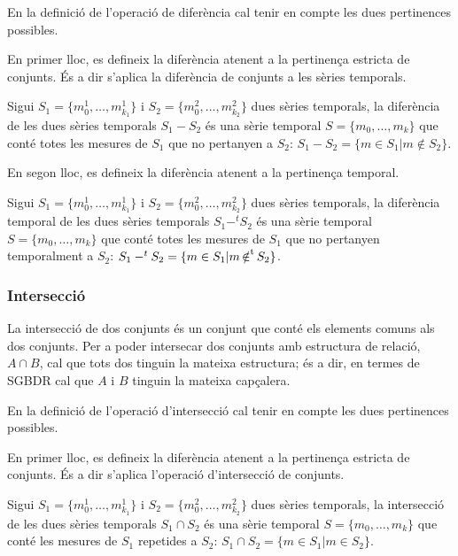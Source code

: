 En la definició de l'operació de diferència cal tenir en compte les
dues pertinences possibles.

En primer lloc, es defineix la diferència atenent a la pertinença
estricta de conjunts. És a dir s'aplica la diferència de
conjunts a les sèries temporals.
\begin{definition}[diferència]
  Sigui $S_1=\{m_0^1, \dotsc, m_{k_1}^1\}$ i $S_2=\{m_0^2, \dotsc,
  m_{k_2}^2\}$ dues sèries temporals, la diferència de les dues
  sèries temporals $S_1 - S_2$ és una sèrie temporal $S=\{m_0,
  \dotsc, m_k\}$ que conté totes les mesures de $S_1$ que no pertanyen a
  $S_2$: $S_1 - S_2 = \{ m \in S_1 | m \notin S_2  \}$.
\end{definition}

En segon lloc, es defineix la diferència atenent a la pertinença
temporal.
\begin{definition}
  Sigui $S_1=\{m_0^1, \dotsc, m_{k_1}^1\}$ i $S_2=\{m_0^2, \dotsc,
  m_{k_2}^2\}$ dues sèries temporals, la diferència temporal de les
  dues sèries temporals $S_1 -^t S_2$ és una sèrie temporal
  $S=\{m_0, \dotsc, m_k\}$ que conté totes les mesures de $S_1$ que no
  pertanyen temporalment a $S_2$: $S_1 -^t S_2 = \{ m \in S_1 | m
  \operatorname*{\notin^t} S_2 \}$.
\end{definition}




\subsubsection{Intersecció}

La intersecció de dos conjunts és un conjunt que conté els elements
comuns als dos conjunts.  Per a poder intersecar dos conjunts amb estructura
de relació, $A \cap B$, cal que tots dos tinguin la mateixa
estructura; és a dir, en termes de SGBDR cal que $A$ i $B$ tinguin la
mateixa capçalera.

En la definició de l'operació d'intersecció cal tenir en compte les
dues pertinences possibles.

En primer lloc, es defineix la diferència atenent a la pertinença
estricta de conjunts. És a dir s'aplica l'operació d'intersecció de
conjunts.
\begin{definition}[intersecció]
  Sigui $S_1=\{m_0^1, \dotsc, m_{k_1}^1\}$ i $S_2=\{m_0^2, \dotsc,
  m_{k_2}^2\}$ dues sèries temporals, la intersecció de les dues
  sèries temporals $S_1 \cap S_2$ és una sèrie temporal $S=\{m_0,
  \dotsc, m_k\}$ que conté les mesures de $S_1$ repetides a $S_2$:
  $S_1 \cap S_2 = \{ m \in S_1 | m \in S_2 \}$.
\end{definition}

